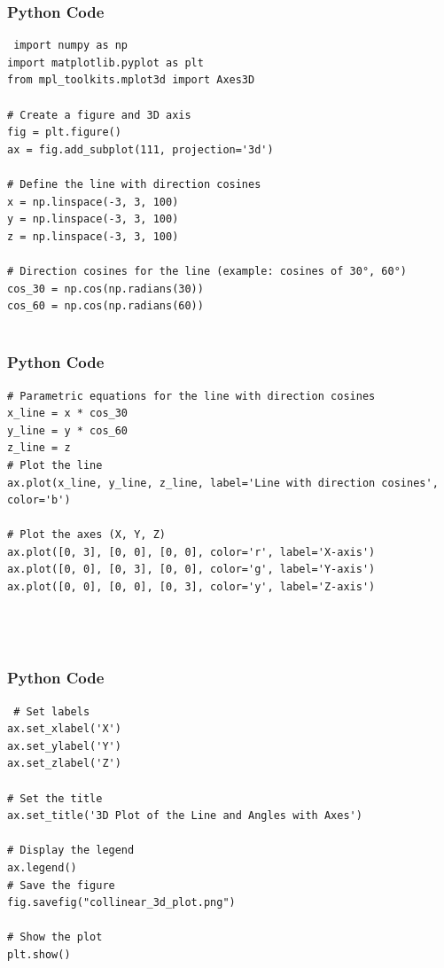 \documentclass{beamer}
\begin{document}
\begin{frame}[fragile]
    \frametitle{Python Code}
    \begin{lstlisting}
 import numpy as np
import matplotlib.pyplot as plt
from mpl_toolkits.mplot3d import Axes3D

# Create a figure and 3D axis
fig = plt.figure()
ax = fig.add_subplot(111, projection='3d')

# Define the line with direction cosines
x = np.linspace(-3, 3, 100)
y = np.linspace(-3, 3, 100)
z = np.linspace(-3, 3, 100)

# Direction cosines for the line (example: cosines of 30°, 60°)
cos_30 = np.cos(np.radians(30))
cos_60 = np.cos(np.radians(60))


\end{lstlisting}
\end{frame}

\begin{frame}[fragile]
    \frametitle{Python Code}

    \begin{lstlisting}
# Parametric equations for the line with direction cosines
x_line = x * cos_30
y_line = y * cos_60
z_line = z
# Plot the line
ax.plot(x_line, y_line, z_line, label='Line with direction cosines', color='b')

# Plot the axes (X, Y, Z)
ax.plot([0, 3], [0, 0], [0, 0], color='r', label='X-axis')
ax.plot([0, 0], [0, 3], [0, 0], color='g', label='Y-axis')
ax.plot([0, 0], [0, 0], [0, 3], color='y', label='Z-axis')




    \end{lstlisting}
\end{frame}

\begin{frame}[fragile]
    \frametitle{Python Code}

    \begin{lstlisting}
 # Set labels
ax.set_xlabel('X')
ax.set_ylabel('Y')
ax.set_zlabel('Z')

# Set the title
ax.set_title('3D Plot of the Line and Angles with Axes')

# Display the legend
ax.legend()
# Save the figure
fig.savefig("collinear_3d_plot.png")

# Show the plot
plt.show()




    \end{lstlisting}
\end{frame}
\end{document}
